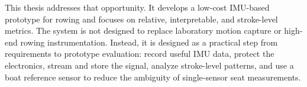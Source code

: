 This thesis addresses that opportunity. It develops a low-cost IMU-based prototype for rowing and focuses on relative, interpretable, and stroke-level metrics. The system is not designed to replace laboratory motion capture or high-end rowing instrumentation. Instead, it is designed as a practical step from requirements to prototype evaluation: record useful IMU data, protect the electronics, stream and store the signal, analyze stroke-level patterns, and use a boat reference sensor to reduce the ambiguity of single-sensor seat measurements.
